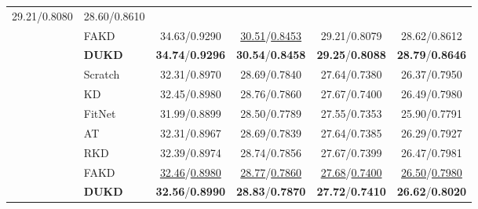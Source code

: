 \documentclass[10pt,twocolumn,letterpaper]{article}
\begin{document}
\begin{table}[]
{\begin{tabular}{@{\hspace{2pt}}l@{\hspace{1.5\tabcolsep}}lcccc@{\hspace{2pt}}}
  29.21/0.8080 &
  28.60/0.8610 \\
 &
  FAKD &
  34.63/0.9290 &
  \underline{30.51}/\underline{0.8453} &
  29.21/0.8079 &
  28.62/0.8612 \\
 &
  \textbf{DUKD} &
  \textbf{34.74}/\textbf{0.9296} &
  \textbf{30.54}/\textbf{0.8458} &
  \textbf{29.25}/\textbf{0.8088} &
  \textbf{28.79}/\textbf{0.8646} \\ \midrule
\multirow{7}{*}{\texttimes4} &
  Scratch &
  32.31/0.8970 &
  28.69/0.7840 &
  27.64/0.7380 &
  26.37/0.7950 \\
 &
  KD &
  32.45/0.8980 &
  28.76/0.7860 &
  27.67/0.7400 &
  26.49/0.7980 \\
 &
  FitNet &
  31.99/0.8899 &
  28.50/0.7789 &
  27.55/0.7353 &
  25.90/0.7791 \\
 &
  AT &
  32.31/0.8967 &
  28.69/0.7839 &
  27.64/0.7385 &
  26.29/0.7927 \\
 &
  RKD &
  32.39/0.8974 &
  28.74/0.7856 &
  27.67/0.7399 &
  26.47/0.7981 \\
 &
  FAKD &
  \underline{32.46}/\underline{0.8980} &
  \underline{28.77}/\underline{0.7860} &
  \underline{27.68}/\underline{0.7400} &
  \underline{26.50}/\underline{0.7980} \\
 &
  \textbf{DUKD} &
  \textbf{32.56}/\textbf{0.8990} &
  \textbf{28.83}/\textbf{0.7870} &
  \textbf{27.72}/\textbf{0.7410} &
  \textbf{26.62}/\textbf{0.8020} \\ \bottomrule
\end{tabular}}
\end{table}
\end{document}
